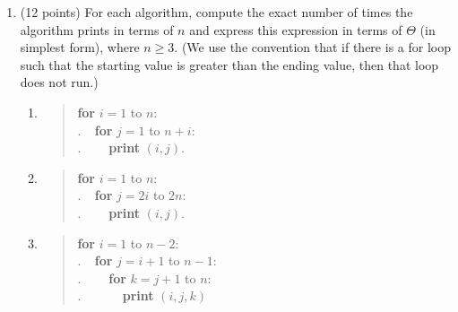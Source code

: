 \documentclass[10pt,letterpaper,unboxed,cm]{article}
\newcommand{\ind}{$~~~~~$}
\theoremstyle{definition}
\begin{document}
\begin{enumerate}
Consider the loop invariant:
\begin{center}
\emph{After each iteration, every list in $Q$ is sorted.}
\end{center}

\begin{enumerate}
\item (6 points)
Prove this loop invariant using induction.
\item (3 points)
Use the loop invariant to show that the algorithm is correct.
\item (3 points)
Use the runtime method we learned in class (product rule for loops) to show that this algorithm runs in $O(n^2)$ time.
\item (3 points) Show that $O(n^2)$ is not a tight bound by doing a more careful analysis.
\end{enumerate}




\item (12 points)
For each algorithm, compute the exact number of times the algorithm prints in terms of $n$ and express this expression in terms of $\Theta$ (in simplest form), where $n \geq 3$. (We use the convention that if there is a for loop such that the starting value is greater than the ending value, then that loop does not run.)

\begin{enumerate}

\item
\begin{quote}
{\bf for} $i=1$ to $n$:\\
.\ind{\bf for} $j=1$ to $n+i$:\\
.\ind\ind {\bf print} $(i,j)$.
\end{quote}

\item
\begin{quote}
{\bf for} $i=1$ to $n$:\\
.\ind{\bf for} $j=2i$ to $2n$:\\
.\ind\ind {\bf print} $(i,j)$.
\end{quote}


\item
\begin{quote}
{\bf for} $i=1$ to $n-2$:\\
.\ind{\bf for} $j=i+1$ to $n-1$:\\
.\ind\ind{\bf for} $k=j+1$ to $n$:\\
.\ind\ind\ind {\bf print} $(i,j,k)$
\end{quote}


\end{enumerate}





\end{enumerate}
\end{document}
